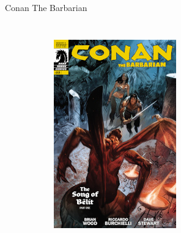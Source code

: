 \begin{frame}{Conan The Barbarian}
\begin{columns}
\begin{figure}[htp]
\begin{subfigure}[b]{0.23\textwidth}
				\includegraphics[width=\textwidth]{img/DH-CTB-22}
			\end{subfigure}
			~
			\begin{subfigure}[b]{0.23\textwidth}

\end{subfigure}
\end{figure}
\end{columns}
\end{frame}
